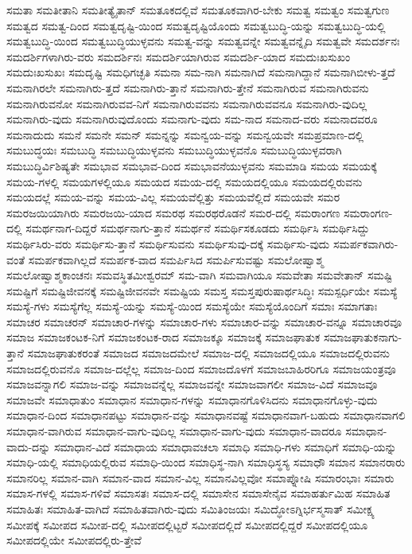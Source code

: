 {ಸಮತಾ
ಸಮತೀತಾನಿ
ಸಮತೀತ್ಯೈತಾನ್
ಸಮತೂಕದಲ್ಲಿವೆ
ಸಮತೂಕವಾಗಿರ-ಬೇಕು
ಸಮತ್ವ
ಸಮತ್ವಂ
ಸಮತ್ವಗುಣ
ಸಮತ್ವದ
ಸಮತ್ವ-ದಿಂದ
ಸಮತ್ವದೃಷ್ಟಿ-ಯಿಂದ
ಸಮತ್ವದೃಷ್ಟಿಯೊಂದು
ಸಮತ್ವಬುದ್ಧಿ-ಯನ್ನು
ಸಮತ್ವಬುದ್ಧಿ-ಯಲ್ಲಿ
ಸಮತ್ವಬುದ್ಧಿ-ಯಿಂದ
ಸಮತ್ವಬುದ್ಧಿಯುಳ್ಳವನು
ಸಮತ್ವ-ವನ್ನು
ಸಮತ್ವವನ್ನೇ
ಸಮತ್ವವನ್ನೈದಿ
ಸಮತ್ವವೇ
ಸಮದರ್ಶನಃ
ಸಮದರ್ಶಿಗಳಾಗಿರು-ವರು
ಸಮದರ್ಶಿನಃ
ಸಮದರ್ಶಿಯಾಗಿರುವ
ಸಮದರ್ಶಿ-ಯಾದ
ಸಮದುಃಖಸುಖಂ
ಸಮದುಃಖಸುಖಃ
ಸಮದೃಷ್ಟಿ
ಸಮಧಿಗಚ್ಛತಿ
ಸಮನಾ
ಸಮ-ನಾಗಿ
ಸಮನಾಗಿದೆ
ಸಮನಾಗಿದ್ದಾನೆ
ಸಮನಾಗಿಬೀಳು-ತ್ತದೆ
ಸಮನಾಗಿರಲೇ
ಸಮನಾಗಿರು-ತ್ತದೆ
ಸಮನಾಗಿರು-ತ್ತಾನೆ
ಸಮನಾಗಿರು-ತ್ತೇನೆ
ಸಮನಾಗಿರುವ
ಸಮನಾಗಿರುವನು
ಸಮನಾಗಿರುವನೋ
ಸಮನಾಗಿರುವವ-ನಿಗೆ
ಸಮನಾಗಿರುವವನು
ಸಮನಾಗಿರುವವನೂ
ಸಮನಾಗಿರು-ವುದಿಲ್ಲ
ಸಮನಾಗಿರು-ವುದು
ಸಮನಾಗಿರುವುದೊಂದು
ಸಮನಾಗು-ವುದು
ಸಮ-ನಾದ
ಸಮನಾದ-ವರು
ಸಮನಾದವರೂ
ಸಮನಾದುದು
ಸಮನೆ
ಸಮನೇ
ಸಮನ್
ಸಮನ್ನನ್ನು
ಸಮನ್ವಯ-ವನ್ನು
ಸಮನ್ವಯವೇ
ಸಮಪ್ರಮಾಣ-ದಲ್ಲಿ
ಸಮಬುದ್ಧಯಃ
ಸಮಬುದ್ಧಿ
ಸಮಬುದ್ಧಿಯುಳ್ಳವನು
ಸಮಬುದ್ಧಿಯುಳ್ಳವನೊ
ಸಮಬುದ್ಧಿಯುಳ್ಳವರಾಗಿ
ಸಮಬುದ್ಧಿರ್ವಿಶಿಷ್ಯತೇ
ಸಮಭಾವ
ಸಮಭಾವ-ದಿಂದ
ಸಮಭಾವನೆಯುಳ್ಳವನು
ಸಮಮಾಡಿ
ಸಮಯ
ಸಮಯಕ್ಕೆ
ಸಮಯ-ಗಳಲ್ಲಿ
ಸಮಯಗಳಲ್ಲಿಯೂ
ಸಮಯದ
ಸಮಯ-ದಲ್ಲಿ
ಸಮಯದಲ್ಲಿಯೂ
ಸಮಯದಲ್ಲಿರುವನು
ಸಮಯದಲ್ಲೆ
ಸಮಯ-ವನ್ನು
ಸಮಯ-ವಿಲ್ಲ
ಸಮಯವೆಲ್ಲಿತ್ತು
ಸಮಯವೆಲ್ಲಿದೆ
ಸಮಯವೇ
ಸಮರ
ಸಮರಜಯಿಯಾಗಿರು
ಸಮರಜಯಿ-ಯಾದ
ಸಮರಥ
ಸಮರಥರೊಡನೆ
ಸಮರ-ದಲ್ಲಿ
ಸಮರಾಂಗಣ
ಸಮರಾಂಗಣ-ದಲ್ಲಿ
ಸಮರ್ಥನಾಗ-ದಿದ್ದರೆ
ಸಮರ್ಥನಾಗು-ತ್ತಾನೆ
ಸಮರ್ಥನೆ
ಸಮರ್ಥಿಸಕೂಡದು
ಸಮರ್ಥಿಸಿ
ಸಮರ್ಥಿಸಿದ್ದು
ಸಮರ್ಥಿಸಿರು-ವರು
ಸಮರ್ಥಿಸು-ತ್ತಾನೆ
ಸಮರ್ಥಿಸುವನು
ಸಮರ್ಥಿಸುವು-ದಕ್ಕೆ
ಸಮರ್ಥಿಸು-ವುದು
ಸಮರ್ಪಕವಾಗಿರು-ವಂತೆ
ಸಮರ್ಪಕವಾಗಿಲ್ಲದೆ
ಸಮರ್ಪಕ-ವಾದ
ಸಮರ್ಪಿಸಿದ
ಸಮರ್ಪಿಸುವಷ್ಟು
ಸಮಲೋಷ್ವಾಶ್ಮ
ಸಮಲೋಷ್ವಾಶ್ಮಕಾಂಚನಃ
ಸಮವಸ್ಥಿತಮೀಶ್ವರಮ್
ಸಮ-ವಾಗಿ
ಸಮವಾಗಿಯೂ
ಸಮವೇತಾ
ಸಮವೇತಾನ್
ಸಮಷ್ಟಿ
ಸಮಷ್ಟಿಗೆ
ಸಮಷ್ಟಿಜೀವನಕ್ಕೆ
ಸಮಷ್ಟಿಜೀವನವೇ
ಸಮಷ್ಟಿಯ
ಸಮಸ್ತ
ಸಮಸ್ತಪುರುಷಾರ್ಥಸಿದ್ಧಿಃ
ಸಮಸ್ಪರ್ಧಿಯೇ
ಸಮಸ್ಯೆ
ಸಮಸ್ಯೆ-ಗಳು
ಸಮಸ್ಯೆಗೆಲ್ಲ
ಸಮಸ್ಯೆ-ಯನ್ನು
ಸಮಸ್ಯೆ-ಯಿಂದ
ಸಮಸ್ಯೆಯೇ
ಸಮಸ್ಯೆಯೊಂದಿಗೆ
ಸಮಾಃ
ಸಮಾಗತಾಃ
ಸಮಾಚರ
ಸಮಾಚರನ್
ಸಮಾಚಾರ-ಗಳನ್ನು
ಸಮಾಚಾರ-ಗಳು
ಸಮಾಚಾರ-ವನ್ನು
ಸಮಾಚಾರ-ವನ್ನೂ
ಸಮಾಚಾರವೂ
ಸಮಾಜ
ಸಮಾಜಕಂಟಕ-ನಿಗೆ
ಸಮಾಜಕಂಟಕ-ರಾದ
ಸಮಾಜಕ್ಕೂ
ಸಮಾಜಕ್ಕೆ
ಸಮಾಜಘಾತುಕ
ಸಮಾಜಘಾತುಕನಾಗು-ತ್ತಾನೆ
ಸಮಾಜಘಾತುಕರಂತೆ
ಸಮಾಜದ
ಸಮಾಜದಮೇಲೆ
ಸಮಾಜ-ದಲ್ಲಿ
ಸಮಾಜದಲ್ಲಿಯೂ
ಸಮಾಜದಲ್ಲಿರುವನು
ಸಮಾಜದಲ್ಲಿರುವನೊ
ಸಮಾಜ-ದಲ್ಲೆಲ್ಲ
ಸಮಾಜ-ದಿಂದ
ಸಮಾಜದೊಳಗೆ
ಸಮಾಜಬಾಹಿರರಿಗೂ
ಸಮಾಜಯಂತ್ರವೂ
ಸಮಾಜವನ್ನಾಗಲಿ
ಸಮಾಜ-ವನ್ನು
ಸಮಾಜವನ್ನೆಲ್ಲ
ಸಮಾಜವನ್ನೇ
ಸಮಾಜವಾಗಲೀ
ಸಮಾಜ-ವಿದೆ
ಸಮಾಜವೂ
ಸಮಾಜವೇ
ಸಮಾಧಾತುಂ
ಸಮಾಧಾನ
ಸಮಾಧಾನ-ಗಳನ್ನು
ಸಮಾಧಾನಗೊಳಿಸಿದನು
ಸಮಾಧಾನಗೊಳ್ಳು-ವುದು
ಸಮಾಧಾನ-ದಿಂದ
ಸಮಾಧಾನಪಟ್ಟು
ಸಮಾಧಾನ-ವನ್ನು
ಸಮಾಧಾನವಷ್ಟೆ
ಸಮಾಧಾನವಾಗ-ಬಹುದು
ಸಮಾಧಾನವಾಗಲಿ
ಸಮಾಧಾನ-ವಾಗಿರುವ
ಸಮಾಧಾನ-ವಾಗು-ವುದಿಲ್ಲ
ಸಮಾಧಾನ-ವಾಗು-ವುದು
ಸಮಾಧಾನ-ವಾದರೂ
ಸಮಾಧಾನ-ವಾದು-ದನ್ನು
ಸಮಾಧಾನ-ವಿದೆ
ಸಮಾಧಾಯ
ಸಮಾಧಾವಚಲಾ
ಸಮಾಧಿ
ಸಮಾಧಿ-ಗಳು
ಸಮಾಧಿಗೆ
ಸಮಾಧಿ-ಯನ್ನು
ಸಮಾಧಿ-ಯಲ್ಲಿ
ಸಮಾಧಿಯಲ್ಲಿರುವ
ಸಮಾಧಿ-ಯಿಂದ
ಸಮಾಧಿಸ್ಥ-ನಾಗಿ
ಸಮಾಧಿಸ್ಥಸ್ಯ
ಸಮಾಧೌ
ಸಮಾನ
ಸಮಾನರಾರು
ಸಮಾನರಿಲ್ಲ
ಸಮಾನ-ವಾಗಿ
ಸಮಾನ-ವಾದ
ಸಮಾನ-ವಿಲ್ಲ
ಸಮಾನವಿಲ್ಲವೋ
ಸಮಾಪ್ನೋಷಿ
ಸಮಾರಂಭಾಃ
ಸಮಾರು
ಸಮಾಸ-ಗಳಲ್ಲಿ
ಸಮಾಸ-ಗಳಿವೆ
ಸಮಾಸತಃ
ಸಮಾಸ-ದಲ್ಲಿ
ಸಮಾಸೇನ
ಸಮಾಸೇನೈವ
ಸಮಾಹರ್ತುಮಿಹ
ಸಮಾಹಿತ
ಸಮಾಹಿತಃ
ಸಮಾಹಿತ-ವಾಗಿದೆ
ಸಮಾಹಿತವಾಗಿರು-ವುದು
ಸಮಿತಿಂಜಯಃ
ಸಮಿದ್ಧೋಽಗ್ನಿರ್ಭಸ್ಮಸಾತ್
ಸಮೀಕ್ಷ್ಯ
ಸಮೀಪಕ್ಕೆ
ಸಮೀಪದ
ಸಮೀಪ-ದಲ್ಲಿ
ಸಮೀಪದಲ್ಲಿಟ್ಟರೆ
ಸಮೀಪದಲ್ಲಿದೆ
ಸಮೀಪದಲ್ಲಿದ್ದರೆ
ಸಮೀಪದಲ್ಲಿಯೂ
ಸಮೀಪದಲ್ಲಿಯೇ
ಸಮೀಪದಲ್ಲಿರು-ತ್ತೇವೆ
}
